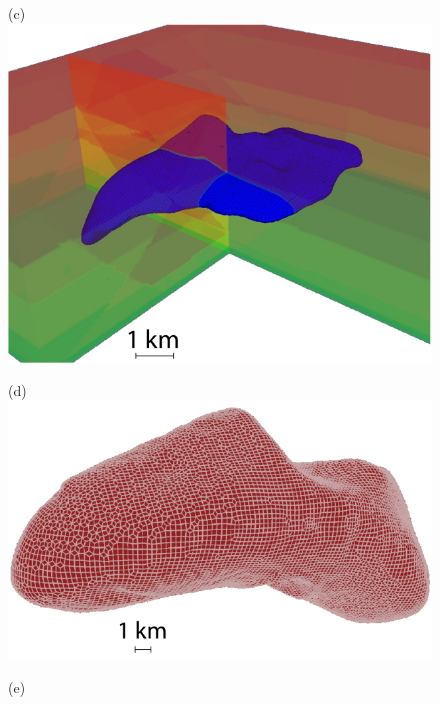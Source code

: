 \documentclass[referee,extra]{gji}
\begin{document}
\begin{figure}
\begin{center}
\begin{minipage}[t]{0.45\textwidth}
\begin{center}
(c)\\
\includegraphics[width=1.\textwidth]{./images/mesh_salt.jpg}
\end{center}
\end{minipage}
\begin{minipage}[t]{0.45\textwidth}
\begin{center}
(d)\\
\includegraphics[width=1.\textwidth]{./images/mesh_asteroid.jpg}
\end{center}
\end{minipage}
\begin{minipage}[t]{0.45\textwidth}
\begin{center}
(e)\\

\end{center}
\end{minipage}
\end{center}
\end{figure}
\end{document}
